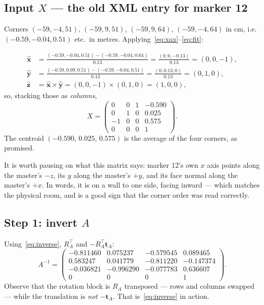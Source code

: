 \documentclass[11pt,a4paper]{article}
\newcommand{\vt}[1]{\mathbf{#1}}
\newcommand{\xh}{\hat{\vt{x}}}
\newcommand{\yh}{\hat{\vt{y}}}
\newcommand{\zh}{\hat{\vt{z}}}
\begin{document}
\subsection{Input $X$ --- the old XML entry for marker 12}

Corners $(-59,-4,51),\,(-59,9,51),\,(-59,9,64),\,(-59,-4,64)$ in cm, i.e.
$(-0.59,-0.04,0.51)$ etc.\ in metres. Applying~\eqref{eq:xax}--\eqref{eq:fit}:

\begin{align*}
  \xh &= \frac{(-0.59,-0.04,0.51) - (-0.59,-0.04,0.64)}{0.13}
       = \frac{(0,0,-0.13)}{0.13} = (0,0,-1), \\
  \yh &= \frac{(-0.59,0.09,0.51) - (-0.59,-0.04,0.51)}{0.13}
       = \frac{(0,0.13,0)}{0.13} = (0,1,0), \\
  \zh &= \xh \times \yh = (0,0,-1) \times (0,1,0) = (1,0,0),
\end{align*}
so, stacking those as \emph{columns},
\begin{equation*}
  X =
  \begin{pmatrix}
     0 & 0 & 1 & -0.590 \\
     0 & 1 & 0 &  0.025 \\
    -1 & 0 & 0 &  0.575 \\
     0 & 0 & 0 &  1
  \end{pmatrix}.
\end{equation*}
The centroid $(-0.590,\,0.025,\,0.575)$ is the average of the four corners, as promised.

It is worth pausing on what this matrix says: marker 12's own $x$ axis points along the
master's $-z$, its $y$ along the master's $+y$, and its face normal along the master's
$+x$. In words, it is on a wall to one side, facing inward --- which matches the physical
room, and is a good sign that the corner order was read correctly.

\subsection{Step 1: invert $A$}

Using~\eqref{eq:inverse}, $R_A^{\!\top}$ and $-R_A^{\!\top}\vt{t}_A$:
\begin{equation*}
  A^{-1} =
  \begin{pmatrix}
    -0.811460 &  0.075237 & -0.579545 &  0.089465 \\
     0.583247 &  0.041779 & -0.811220 & -0.147374 \\
    -0.036821 & -0.996290 & -0.077783 &  0.636607 \\
     0        &  0        &  0        &  1
  \end{pmatrix}.
\end{equation*}
Observe that the rotation block is $R_A$ transposed --- rows and columns swapped --- while
the translation is \emph{not} $-\vt{t}_A$. That is~\eqref{eq:inverse} in action.
\end{document}
